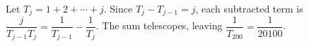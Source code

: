 Let $T_j=1+2+\cdots+j$. Since $T_j-T_{j-1}=j$, each subtracted term is $\dfrac{j}{T_{j-1}T_j}=\dfrac{1}{T_{j-1}}-\dfrac{1}{T_j}$. The sum telescopes, leaving $\dfrac{1}{T_{200}}=\boxed{\dfrac{1}{20100}}$.
